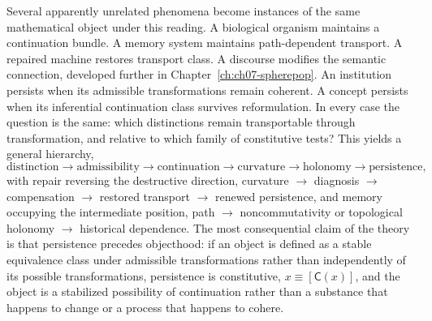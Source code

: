 Several apparently unrelated phenomena become instances of the same mathematical object under this reading. A biological organism maintains a continuation bundle. A memory system maintains path-dependent transport. A repaired machine restores transport class. A discourse modifies the semantic connection, developed further in Chapter~\ref{ch:ch07-spherepop}. An institution persists when its admissible transformations remain coherent. A concept persists when its inferential continuation class survives reformulation. In every case the question is the same: which distinctions remain transportable through transformation, and relative to which family of constitutive tests? This yields a general hierarchy,
\[
\text{distinction} \to \text{admissibility} \to \text{continuation} \to \text{curvature} \to \text{holonomy} \to \text{persistence},
\]
with repair reversing the destructive direction, curvature $\to$ diagnosis $\to$ compensation $\to$ restored transport $\to$ renewed persistence, and memory occupying the intermediate position, path $\to$ noncommutativity or topological holonomy $\to$ historical dependence. The most consequential claim of the theory is that persistence precedes objecthood: if an object is defined as a stable equivalence class under admissible transformations rather than independently of its possible transformations, persistence is constitutive, $x \equiv [\mathsf{C}(x)]$, and the object is a stabilized possibility of continuation rather than a substance that happens to change or a process that happens to cohere.
